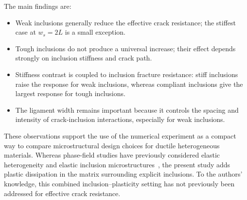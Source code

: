 \documentclass[pdflatex,sn-mathphys-num]{sn-jnl}
\begin{document}
The main findings are:
\begin{itemize}
    \item Weak inclusions generally reduce the effective crack resistance; the stiffest case at \(w_s=2L\) is a small exception.
    \item Tough inclusions do not produce a universal increase; their effect depends strongly on inclusion stiffness and crack path.
    \item Stiffness contrast is coupled to inclusion fracture resistance: stiff inclusions raise the response for weak inclusions, whereas compliant inclusions give the largest response for tough inclusions.
    \item The ligament width remains important because it controls the spacing and intensity of crack-inclusion interactions, especially for weak inclusions.
\end{itemize}
These observations support the use of the numerical experiment as a compact way to compare microstructural design choices for ductile heterogeneous materials. Whereas phase-field studies have previously considered elastic heterogeneity and elastic inclusion microstructures~\cite{hossain_effective_2014,kuhn_discussion_2016,bohnen_simulation_2024,singh_optimization_2023}, the present study adds plastic dissipation in the matrix surrounding explicit inclusions. To the authors' knowledge, this combined inclusion--plasticity setting has not previously been addressed for effective crack resistance.


\end{document}
